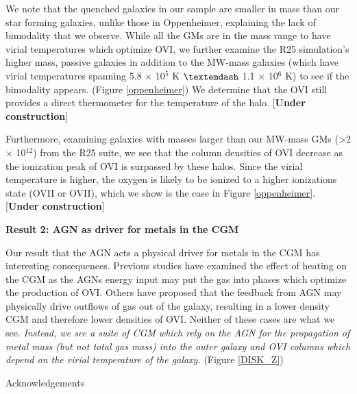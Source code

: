 \documentclass[]{emulateapj}
\begin{document}
We note that the quenched galaxies in our sample are smaller in mass than our star forming galaxies, unlike those in Oppenheimer, explaining the lack of bimodality that we observe. While all the GMs are in the mass range to have virial temperatures which optimize OVI, we further examine the R25 simulation's higher mass, passive galaxies in addition to the MW-mass galaxies (which have virial temperatures spanning 5.8 $\times$ 10$^{5}$ K $\textemdash$ 1.1 $\times$ 10$^{6}$ K) to see if the bimodality appears. (Figure \ref{oppenheimer}) We determine that the OVI still provides a direct thermometer for the temperature of the halo. [\textbf{Under construction}]

Furthermore, examining galaxies with masses larger than our MW-mass GMs (\textgreater 2 $\times$ 10$^{12}$) from the R25 suite, we see that the column densities of OVI decrease as the ionization peak of OVI is surpassed by these halos. Since the virial temperature is higher, the oxygen is likely to be ionized to a higher ionizations state (OVII or OVII), which we show is the case in Figure \ref{oppenheimer}. [\textbf{Under construction}]

\textbf{Result 2: AGN as driver for metals in the CGM}

Our result that the AGN acts a physical driver for metals in the CGM has interesting consequences. Previous studies have examined the effect of heating on the CGM as the AGNs energy input may put the gas into phases which optimize the production of OVI. \citep{Suresh2017} Others have proposed that the feedback from AGN may physically drive outflows of gas out of the galaxy, resulting in a lower density CGM and therefore lower densities of OVI. Neither of these cases are what we see. \textit{Instead, we see a suite of CGM which rely on the AGN for the propagation of metal mass (but not total gas mass) into the outer galaxy and OVI columns which depend on the virial temperature of the galaxy.} (Figure \ref{DISK_Z})


\acknowledgments
Acknowledgements


\end{document}
